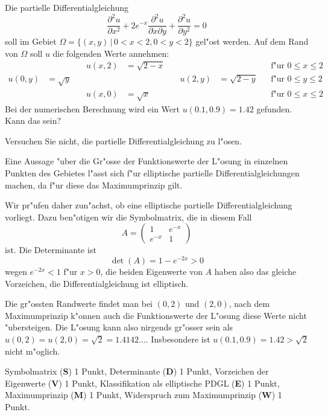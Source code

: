 Die partielle Differentialgleichung
\[
\frac{\partial^2 u}{\partial x^2}
+
2e^{-x}
\frac{\partial^2 u}{\partial x\partial y}
+
\frac{\partial^2 u}{\partial y^2}
=
0
\]
soll im Gebiet $\Omega=\{(x,y)\,|\, 0<x<2, 0<y<2\}$ gel"ost werden.
Auf dem Rand von $\Omega$ soll $u$ die folgenden Werte annehmen:
\begin{align*}
      &    &\quad u(x,2)&=\sqrt{2-x}&\quad       &        &&\text{f"ur $0\le x\le 2$}\\
u(0,y)&=\sqrt{y}&\quad       &        &\quad u(2,y)&=\sqrt{2-y}&&\text{f"ur $0\le y\le 2$}\\
      &    &\quad u(x,0)&=\sqrt{x}    &\quad       &        &&\text{f"ur $0\le x\le 2$}
\end{align*}
Bei der numerischen Berechnung wird ein Wert $u(0.1,0.9)=1.42$ gefunden.
Kann das sein?

\begin{hinweis}
Versuchen Sie nicht, die partielle Differentialgleichung zu l"osen.
\end{hinweis}

\begin{loesung}
Eine Aussage "uber die Gr"osse der Funktionswerte der L"osung in
einzelnen Punkten des Gebietes l"asst sich f"ur elliptische
partielle Differentialgleichungen machen, da f"ur diese das Maximumprinzip
gilt.

Wir pr"ufen daher zun"achst, ob eine elliptische partielle
Differentialgleichung vorliegt. Dazu ben"otigen wir die Symbolmatrix,
die in diesem Fall
\[
A=\begin{pmatrix}
1&e^{-x}\\
e^{-x}&1
\end{pmatrix}
\]
ist. Die Determinante ist
\[
\det(A)=1-e^{-2x}>0
\]
wegen
$e^{-2x}<1$
f"ur $x>0$, die beiden Eigenwerte von $A$ haben also das gleiche Vorzeichen,
die Differentialgleichung ist elliptisch.

Die gr"ossten Randwerte findet man bei $(0,2)$ und $(2,0)$, nach dem
Maximumprinzip
k"onnen auch die Funktionswerte der L"osung diese Werte nicht "ubersteigen.
Die L"osung kann also nirgends gr"osser sein als
$u(0,2)=u(2,0)=\sqrt{2}=1.4142\dots$.
Insbesondere ist $u(0.1,0.9)=1.42>\sqrt{2}$ nicht m"oglich.
\end{loesung}

\begin{bewertung}
Symbolmatrix ({\bf S}) 1 Punkt,
Determinante ({\bf D}) 1 Punkt,
Vorzeichen der Eigenwerte ({\bf V}) 1 Punkt,
Klassifikation als elliptische PDGL ({\bf E}) 1 Punkt,
Maximumprinzip ({\bf M}) 1 Punkt,
Widerspruch zum Maximumprinzip ({\bf W}) 1 Punkt.
\end{bewertung}

